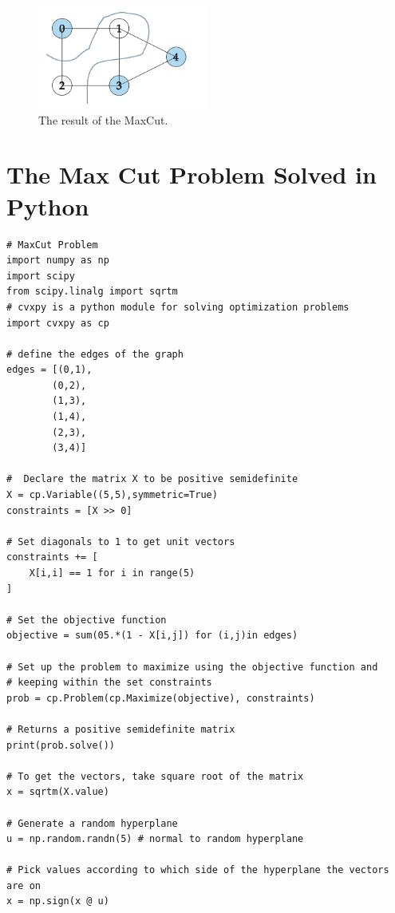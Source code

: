 \begin{figure}[htbp]
    \centering
    \includegraphics[width=0.5\textwidth]{max-cut.png}
    \caption{The result of the MaxCut.}
    \label{fig:MaxCut-result}
\end{figure}

\section{The Max Cut Problem Solved in Python}
\begin{Verbatim}       
# MaxCut Problem
import numpy as np
import scipy 
from scipy.linalg import sqrtm
# cvxpy is a python module for solving optimization problems
import cvxpy as cp

# define the edges of the graph
edges = [(0,1),
        (0,2),
        (1,3),
        (1,4),
        (2,3),
        (3,4)]

#  Declare the matrix X to be positive semidefinite
X = cp.Variable((5,5),symmetric=True)
constraints = [X >> 0]

# Set diagonals to 1 to get unit vectors
constraints += [
    X[i,i] == 1 for i in range(5)
]

# Set the objective function
objective = sum(05.*(1 - X[i,j]) for (i,j)in edges)

# Set up the problem to maximize using the objective function and
# keeping within the set constraints
prob = cp.Problem(cp.Maximize(objective), constraints)

# Returns a positive semidefinite matrix
print(prob.solve())

# To get the vectors, take square root of the matrix
x = sqrtm(X.value)

# Generate a random hyperplane
u = np.random.randn(5) # normal to random hyperplane

# Pick values according to which side of the hyperplane the vectors are on
x = np.sign(x @ u)  
      
\end{Verbatim}










